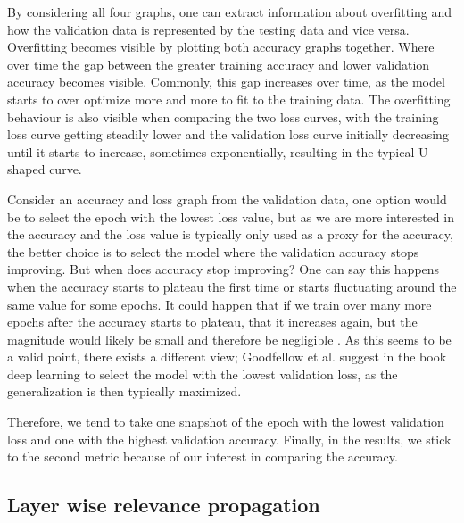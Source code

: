 By considering all four graphs, one can extract information about overfitting and how the validation data is represented by the testing data and vice versa.
Overfitting becomes visible by plotting both accuracy graphs together. Where over time the gap between the greater training accuracy and lower validation accuracy becomes visible.
Commonly, this gap increases over time, as the model starts to over optimize more and more to fit to the training data.
The overfitting behaviour is also visible when comparing the two loss curves, with the training loss curve getting steadily lower and the validation loss curve initially decreasing until it starts to increase, sometimes exponentially, resulting in the typical U-shaped curve.

Consider an accuracy and loss graph from the validation data, one option would be to select the epoch with the lowest loss value, but as we are more interested in the accuracy and the loss value is typically only used as a proxy for the accuracy, the better choice is to select the model where the validation accuracy stops improving. But when does accuracy stop improving? One can say this happens when the accuracy starts to plateau the first time or starts fluctuating around the same value for some epochs. It could happen that if we train over many more epochs after the accuracy starts to plateau, that it increases again, but the magnitude would likely be small and therefore be negligible \cite{nielsen2015neural}.
As this seems to be a valid point, there exists a different view; Goodfellow et al. suggest in the book deep learning \cite{Goodfellow-et-al-2016} to select the model with the lowest validation loss, as the generalization is then typically maximized.

Therefore, we tend to take one snapshot of the epoch with the lowest validation loss and one with the highest validation accuracy. Finally, in the results, we stick to the second metric because of our interest in comparing the accuracy.


\subsection{Layer wise relevance propagation}\label{sec:evaluation_lrp}

